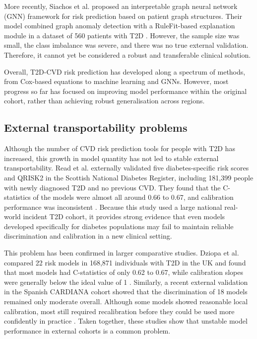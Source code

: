 \documentclass[conference]{IEEEtran}
\begin{document}
More recently, Siachos et al. proposed an interpretable graph neural network (GNN) framework for risk prediction based on patient graph structures. Their model combined graph anomaly detection with a RuleFit-based explanation module in a dataset of 560 patients with T2D \cite{siachos2026interpretable}. However, the sample size was small, the class imbalance was severe, and there was no true external validation. Therefore, it cannot yet be considered a robust and transferable clinical solution.

Overall, T2D-CVD risk prediction has developed along a spectrum of methods, from Cox-based equations to machine learning and GNNs. However, most progress so far has focused on improving model performance within the original cohort, rather than achieving robust generalisation across regions.

\subsection{External transportability problems}

Although the number of CVD risk prediction tools for people with T2D has increased, this growth in model quantity has not led to stable external transportability. Read et al. externally validated five diabetes-specific risk scores and QRISK2 in the Scottish National Diabetes Register, including 181,399 people with newly diagnosed T2D and no previous CVD. They found that the C-statistics of the models were almost all around 0.66 to 0.67, and calibration performance was inconsistent \cite{read2018performance}. Because this study used a large national real-world incident T2D cohort, it provides strong evidence that even models developed specifically for diabetes populations may fail to maintain reliable discrimination and calibration in a new clinical setting.

This problem has been confirmed in larger comparative studies. Dziopa et al. compared 22 risk models in 168,871 individuals with T2D in the UK and found that most models had C-statistics of only 0.62 to 0.67, while calibration slopes were generally below the ideal value of 1 \cite{dziopa2022cardiovascular}. Similarly, a recent external validation in the Spanish CARDIANA cohort showed that the discrimination of 18 models remained only moderate overall. Although some models showed reasonable local calibration, most still required recalibration before they could be used more confidently in practice \cite{enguita2026external}. Taken together, these studies show that unstable model performance in external cohorts is a common problem.
\end{document}
